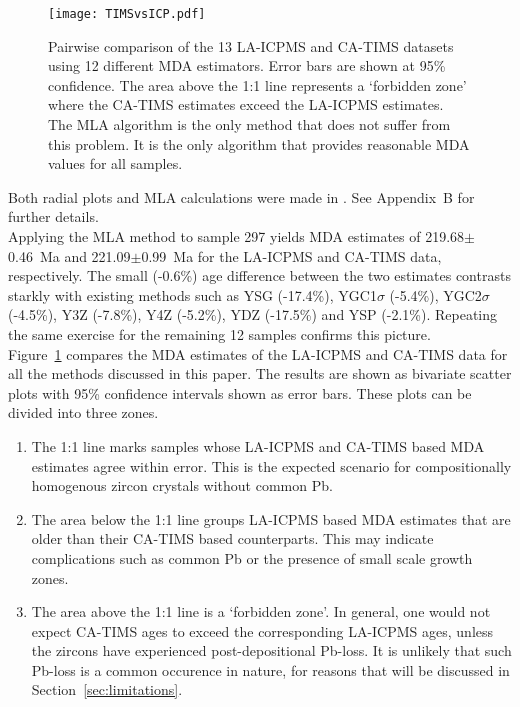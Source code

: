 \documentclass{article}
\begin{document}
\begin{figure}[!ht]
  \texttt{[image: TIMSvsICP.pdf]}
  \caption{Pairwise comparison of the 13 LA-ICPMS and CA-TIMS datasets
    using 12 different MDA estimators. Error bars are shown at 95\%
    confidence.  The area above the 1:1 line represents a `forbidden
    zone' where the CA-TIMS estimates exceed the LA-ICPMS
    estimates. The MLA algorithm is the only method that does not
    suffer from this problem. It is the only algorithm that provides
    reasonable MDA values for all samples.}
  \label{fig:TIMSvsICP}
\end{figure}

Both radial plots and MLA calculations were made in
\citet[\texttt{IsoplotR},][]{vermeesch2018c}. See Appendix~B for
further details.\\

Applying the MLA method to sample 297 yields MDA estimates of
219.68$\pm$0.46~Ma and 221.09$\pm$0.99~Ma for the LA-ICPMS and CA-TIMS
data, respectively. The small (-0.6\%) age difference between the two
estimates contrasts starkly with existing methods such as YSG
(-17.4\%), YGC1$\sigma$ (-5.4\%), YGC2$\sigma$ (-4.5\%), Y3Z (-7.8\%),
Y4Z (-5.2\%), YDZ (-17.5\%) and YSP (-2.1\%). Repeating the same
exercise for the remaining 12 samples confirms this picture.\\

Figure~\ref{fig:TIMSvsICP} compares the MDA estimates of the LA-ICPMS
and CA-TIMS data for all the methods discussed in this paper.  The
results are shown as bivariate scatter plots with 95\% confidence
intervals shown as error bars. These plots can be divided into three
zones.

\begin{enumerate}
\item The 1:1 line marks samples whose LA-ICPMS and CA-TIMS based MDA
  estimates agree within error. This is the expected scenario for
  compositionally homogenous zircon crystals without common Pb.
\item The area below the 1:1 line groups LA-ICPMS based MDA estimates
  that are older than their CA-TIMS based counterparts. This may
  indicate complications such as common Pb or the presence of small
  scale growth zones.
\item The area above the 1:1 line is a `forbidden zone'. In general,
  one would not expect CA-TIMS ages to exceed the corresponding
  LA-ICPMS ages, unless the zircons have experienced post-depositional
  Pb-loss. It is unlikely that such Pb-loss is a common occurence in
  nature, for reasons that will be discussed in
  Section~\ref{sec:limitations}.
\end{enumerate}
\end{document}
